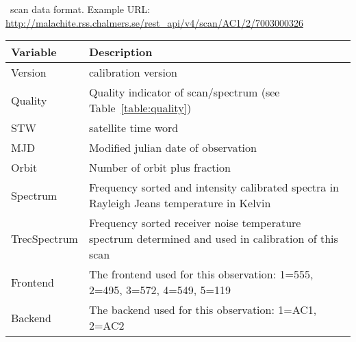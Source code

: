 \begin{table}
\caption{ \smr\ scan data format.
Example URL: \url{http://malachite.rss.chalmers.se/rest_api/v4/scan/AC1/2/7003000326}}
\label{table:dataformat}
\end{table}
\addtocounter{table}{-1}
\begin{longtable}{| p{} | p{} |} 
\hline
  \textbf{Variable} & \textbf{Description} \\
  \hline
     Version         & calibration version \\ \hline
     Quality         & Quality indicator of scan/spectrum (see Table~\ref{table:quality}) \\ \hline
     STW             & satellite time word\\ \hline
     MJD             & Modified julian date of observation \\ \hline
     Orbit           & Number of orbit plus fraction \\ \hline
     Spectrum        & Frequency sorted and intensity calibrated spectra
                       in Rayleigh Jeans temperature in Kelvin\\ \hline
     TrecSpectrum    & Frequency sorted receiver noise temperature spectrum
                       determined and used in calibration of this scan \\ \hline
     Frontend        & The frontend used for this observation: 1=555, 2=495, 3=572, 4=549, 5=119\\ \hline
     Backend         & The backend used for this observation: 1=AC1, 2=AC2\\ \hline

\end{longtable}
